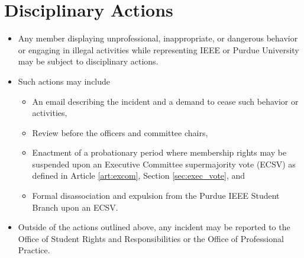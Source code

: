 \documentclass[12pt]{constitution}
\begin{document}
\section{Disciplinary Actions}
\label{sec:mem_discip}
\begin{itemize}
    \item Any member displaying unprofessional, inappropriate, or dangerous behavior or engaging in illegal activities while representing IEEE or Purdue University may be subject to disciplinary actions.
    \item Such actions may include
    \begin{itemize}
        \item An email describing the incident and a demand to cease such behavior or activities,
        \item Review before the officers and committee chairs,
        \item Enactment of a probationary period where membership rights may be suspended upon an Executive Committee supermajority vote (ECSV) as defined in Article \ref{art:excom}, Section \ref{sec:exec_vote}, and
        \item Formal disassociation and expulsion from the Purdue IEEE Student Branch upon an ECSV.
    \end{itemize}
    \item Outside of the actions outlined above, any incident may be reported to the Office of Student Rights and Responsibilities or the Office of Professional Practice.
\end{itemize}


\label{art:excom}
\end{document}

